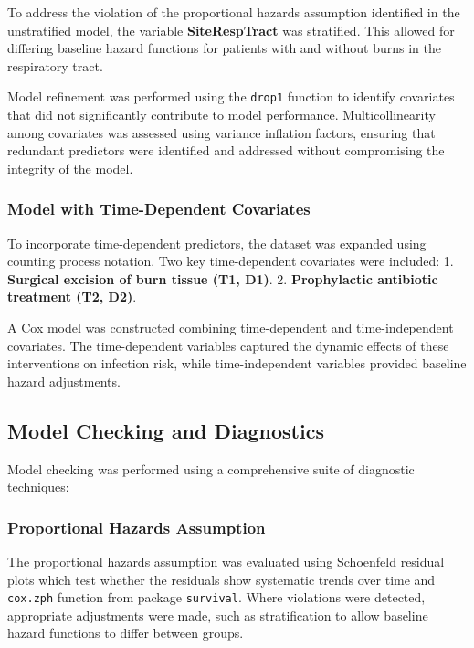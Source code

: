 \documentclass[12pt]{article}
\begin{document}
To address the violation of the proportional hazards assumption
identified in the unstratified model, the variable
\textbf{SiteRespTract} was stratified. This allowed for differing
baseline hazard functions for patients with and without burns in the
respiratory tract.

Model refinement was performed using the \texttt{drop1} function to
identify covariates that did not significantly contribute to model
performance. Multicollinearity among covariates was assessed using
variance inflation factors, ensuring that redundant predictors were
identified and addressed without compromising the integrity of the
model.

\subsubsection{\texorpdfstring{\textbf{Model with Time-Dependent
Covariates}}{Model with Time-Dependent Covariates}}\label{model-with-time-dependent-covariates}

To incorporate time-dependent predictors, the dataset was expanded using
counting process notation. Two key time-dependent covariates were
included: 1. \textbf{Surgical excision of burn tissue (T1, D1)}. 2.
\textbf{Prophylactic antibiotic treatment (T2, D2)}.

A Cox model was constructed combining time-dependent and
time-independent covariates. The time-dependent variables captured the
dynamic effects of these interventions on infection risk, while
time-independent variables provided baseline hazard adjustments.

\subsection{\texorpdfstring{\textbf{Model Checking and
Diagnostics}}{Model Checking and Diagnostics}}\label{model-checking-and-diagnostics}

Model checking was performed using a comprehensive suite of diagnostic
techniques:

\subsubsection{\texorpdfstring{\textbf{Proportional Hazards
Assumption}}{Proportional Hazards Assumption}}\label{proportional-hazards-assumption}

The proportional hazards assumption was evaluated using Schoenfeld
residual plots which test whether the residuals show systematic trends
over time and \texttt{cox.zph} function from package \texttt{survival}.
Where violations were detected, appropriate adjustments were made, such
as stratification to allow baseline hazard functions to differ between
groups.
\end{document}
